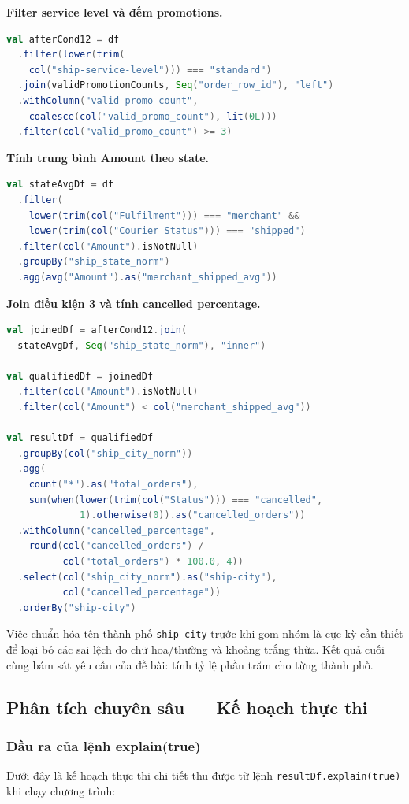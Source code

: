 \textbf{Filter service level và đếm promotions.}
\begin{lstlisting}[language=Scala]
val afterCond12 = df
  .filter(lower(trim(
    col("ship-service-level"))) === "standard")
  .join(validPromotionCounts, Seq("order_row_id"), "left")
  .withColumn("valid_promo_count",
    coalesce(col("valid_promo_count"), lit(0L)))
  .filter(col("valid_promo_count") >= 3)
\end{lstlisting}

\textbf{Tính trung bình Amount theo state.}
\begin{lstlisting}[language=Scala]
val stateAvgDf = df
  .filter(
    lower(trim(col("Fulfilment"))) === "merchant" &&
    lower(trim(col("Courier Status"))) === "shipped")
  .filter(col("Amount").isNotNull)
  .groupBy("ship_state_norm")
  .agg(avg("Amount").as("merchant_shipped_avg"))
\end{lstlisting}

\textbf{Join điều kiện 3 và tính cancelled percentage.}
\begin{lstlisting}[language=Scala]
val joinedDf = afterCond12.join(
  stateAvgDf, Seq("ship_state_norm"), "inner")

val qualifiedDf = joinedDf
  .filter(col("Amount").isNotNull)
  .filter(col("Amount") < col("merchant_shipped_avg"))

val resultDf = qualifiedDf
  .groupBy(col("ship_city_norm"))
  .agg(
    count("*").as("total_orders"),
    sum(when(lower(trim(col("Status"))) === "cancelled",
             1).otherwise(0)).as("cancelled_orders"))
  .withColumn("cancelled_percentage",
    round(col("cancelled_orders") /
          col("total_orders") * 100.0, 4))
  .select(col("ship_city_norm").as("ship-city"),
          col("cancelled_percentage"))
  .orderBy("ship-city")
\end{lstlisting}

Việc chuẩn hóa tên thành phố \texttt{ship-city} trước khi gom nhóm là cực kỳ cần thiết để loại bỏ các sai lệch do chữ hoa/thường và khoảng trắng thừa. Kết quả cuối cùng bám sát yêu cầu của đề bài: tính tỷ lệ phần trăm cho từng thành phố.

\subsection{Phân tích chuyên sâu --- Kế hoạch thực thi}

\subsubsection{Đầu ra của lệnh explain(true)}
Dưới đây là kế hoạch thực thi chi tiết thu được từ lệnh \texttt{resultDf.explain(true)} khi chạy chương trình:

